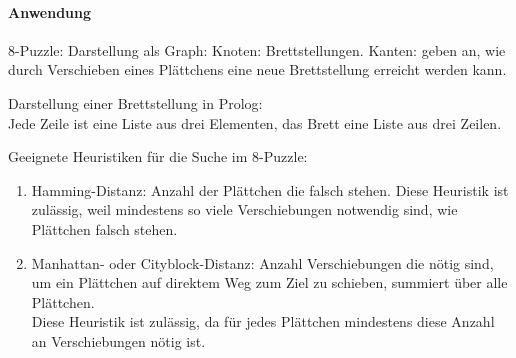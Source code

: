 \documentclass[a4paper]{scrartcl}
\begin{document}
\paragraph{Anwendung} 8-Puzzle: %
Darstellung als Graph:
Knoten: Brettstellungen.
Kanten: geben an, wie durch Verschieben eines Plättchens eine neue Brettstellung erreicht werden kann.

Darstellung einer Brettstellung in Prolog:\\
Jede Zeile ist eine Liste aus drei Elementen, das Brett eine Liste aus drei Zeilen.

Geeignete Heuristiken für die Suche im 8-Puzzle:
\begin{enumerate}
\item Hamming-Distanz: Anzahl der Plättchen die falsch stehen. Diese Heuristik ist zulässig, weil mindestens so viele Verschiebungen notwendig sind, wie Plättchen falsch stehen.
\item Manhattan- oder Cityblock-Distanz: Anzahl Verschiebungen die nötig sind, um ein Plättchen auf direktem Weg zum Ziel zu schieben, summiert über alle Plättchen.\\
Diese Heuristik ist zulässig, da für jedes Plättchen mindestens diese Anzahl an Verschiebungen nötig ist.
\end{enumerate}
\end{document}
